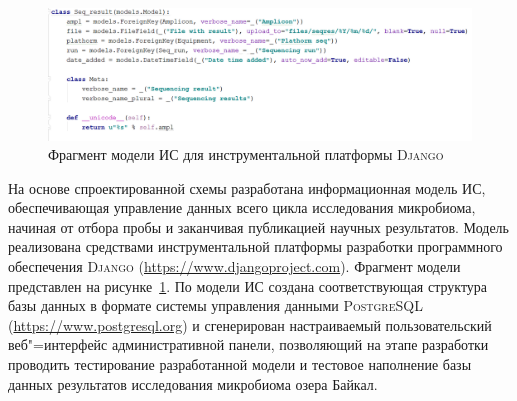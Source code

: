 \documentclass[a4paper,12pt,openany,final]{extreport}
\def\oldcaption{} \let\oldcaption=\caption
\def\caption{\stepcounter{captionsnum}\oldcaption}
\begin{document}
\begin{figure}\centering
\includegraphics[width=0.9\linewidth]{media/image16.png}

\caption{Фрагмент модели ИС для инструментальной платформы \textsc{Django}}\label{fig:instrmod}

\end{figure}

На основе спроектированной схемы разработана информационная модель ИС, обеспечивающая управление данных всего цикла исследования микробиома, начиная от отбора пробы и заканчивая публикацией научных результатов.  Модель реализована средствами инструментальной платформы разработки программного обеспечения \textsc{Django} (\href{https://www.djangoproject.com}{{https://www.djangoproject.com}}).  Фрагмент модели представлен на рисунке~\ref{fig:instrmod}. По модели ИС создана соответствующая структура базы данных в формате системы управления данными \textsc{PostgreSQL} (\href{https://www.postgresql.org}{{https://www.postgresql.org}}) и сгенерирован настраиваемый пользовательский веб"=интерфейс административной панели, позволяющий на этапе разработки проводить тестирование разработанной модели и тестовое наполнение базы данных результатов исследования микробиома озера Байкал.
\end{document}
